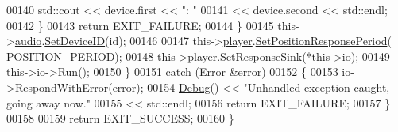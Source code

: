 \begin{DoxyCode}
00140                 std::cout << device.first << \textcolor{stringliteral}{": "}
00141                           << device.second << std::endl;
00142             \}
00143             \textcolor{keywordflow}{return} EXIT\_FAILURE;
00144         \}
00145         this->\hyperlink{classplayd_a2c7193680bd18f1e9b3f63f2234485de}{audio}.\hyperlink{classAudioSystem_ade3b400828991d02e36a0b61302d30d2}{SetDeviceID}(\textcolor{keywordtype}{id});
00146 
00147         this->\hyperlink{classplayd_a8712fc23f3139a2fd2e9dbfb24b998dd}{player}.\hyperlink{classPlayer_a1e65e04dae199230d80639112ac07288}{SetPositionResponsePeriod}(
      \hyperlink{classplayd_a540bcb2dac9488bcb8e593378005bd07}{POSITION\_PERIOD});
00148         this->\hyperlink{classplayd_a8712fc23f3139a2fd2e9dbfb24b998dd}{player}.\hyperlink{classPlayer_a719de5af4d1534c2d805a19d5d995deb}{SetResponseSink}(*this->\hyperlink{classplayd_a066cb450455e1359e4f80cfa5ecb5c05}{io});
00149         this->\hyperlink{classplayd_a066cb450455e1359e4f80cfa5ecb5c05}{io}->Run();
00150     \}
00151     \textcolor{keywordflow}{catch} (\hyperlink{classError}{Error} &error)
00152     \{
00153         \hyperlink{classplayd_a066cb450455e1359e4f80cfa5ecb5c05}{io}->RespondWithError(error);
00154         \hyperlink{classDebug}{Debug}() << \textcolor{stringliteral}{"Unhandled exception caught, going away now."}
00155                 << std::endl;
00156         \textcolor{keywordflow}{return} EXIT\_FAILURE;
00157     \}
00158 
00159     \textcolor{keywordflow}{return} EXIT\_SUCCESS;
00160 \}
\end{DoxyCode}
